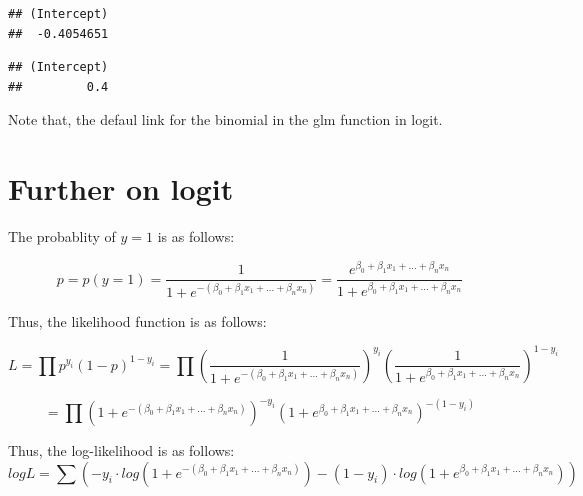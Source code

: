 \documentclass[
]{book}
\newenvironment{Shaded}{\begin{snugshade}}{\end{snugshade}}
\newcommand{\DataTypeTok}[1]{\textcolor[rgb]{0.13,0.29,0.53}{#1}}
\newcommand{\DecValTok}[1]{\textcolor[rgb]{0.00,0.00,0.81}{#1}}
\newcommand{\KeywordTok}[1]{\textcolor[rgb]{0.13,0.29,0.53}{\textbf{#1}}}
\newcommand{\NormalTok}[1]{#1}
\newcommand{\OperatorTok}[1]{\textcolor[rgb]{0.81,0.36,0.00}{\textbf{#1}}}
\newcommand{\StringTok}[1]{\textcolor[rgb]{0.31,0.60,0.02}{#1}}
\begin{document}
\begin{Shaded}
\end{Shaded}

\begin{verbatim}
## (Intercept) 
##  -0.4054651
\end{verbatim}

\begin{Shaded}
\end{Shaded}

\begin{verbatim}
## (Intercept) 
##         0.4
\end{verbatim}

Note that, the defaul link for the binomial in the glm function in logit.

\hypertarget{further-on-logit}{%
\section{Further on logit}\label{further-on-logit}}

The probablity of \(y=1\) is as follows:

\[p=p(y=1)=\frac{1}{1+e^{-(\beta_0+\beta_1x_1+...+\beta_nx_n)}}=\frac{e^{\beta_0+\beta_1x_1+...+\beta_nx_n}}{1+e^{\beta_0+\beta_1x_1+...+\beta_nx_n}}\]

Thus, the likelihood function is as follows:

\[L=\prod p^{y_i}(1-p)^{1-y_i}=\prod (\frac{1}{1+e^{-(\beta_0+\beta_1x_1+...+\beta_nx_n)}})^{y_i}(\frac{1}{1+e^{\beta_0+\beta_1x_1+...+\beta_nx_n}})^{1-y_i}\]

\[=\prod (1+e^{-(\beta_0+\beta_1x_1+...+\beta_nx_n)})^{-y_i}(1+e^{\beta_0+\beta_1x_1+...+\beta_nx_n})^{-(1-y_i)}\]

Thus, the log-likelihood is as follows:
\[logL=\sum (-y_i \cdot log(1+e^{-(\beta_0+\beta_1x_1+...+\beta_nx_n)})-(1-y_i)\cdot log(1+e^{\beta_0+\beta_1x_1+...+\beta_nx_n}))\]
\end{document}
